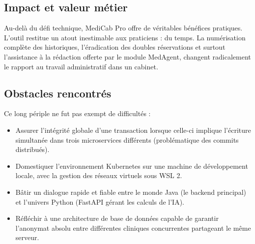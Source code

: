 \documentclass[final]{report}
\begin{document}
\subsection*{Impact et valeur métier}
Au-delà du défi technique, MediCab Pro offre de véritables bénéfices pratiques. L'outil restitue un atout inestimable aux praticiens : du temps. La numérisation complète des historiques, l'éradication des doubles réservations et surtout l'assistance à la rédaction offerte par le module MedAgent, changent radicalement le rapport au travail administratif dans un cabinet.
 
\subsection*{Obstacles rencontrés}
Ce long périple ne fut pas exempt de difficultés :
\begin{itemize}
  \item Assurer l'intégrité globale d'une transaction lorsque celle-ci implique l'écriture simultanée dans trois microservices différents (problématique des commits distribués).
  \item Domestiquer l'environnement Kubernetes sur une machine de développement locale, avec la gestion des réseaux virtuels sous WSL 2.
  \item Bâtir un dialogue rapide et fiable entre le monde Java (le backend principal) et l'univers Python (FastAPI gérant les calculs de l'IA).
  \item Réfléchir à une architecture de base de données capable de garantir l'anonymat absolu entre différentes cliniques concurrentes partageant le même serveur.
\end{itemize}
 
\end{document}
